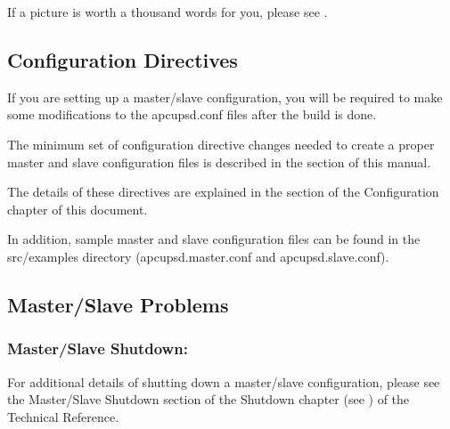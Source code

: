 {{{{{{If a picture is worth a thousand words for you, please see 
. 

\label{Configuration-Directives}

\subsection*{Configuration Directives}

\label{index-Directives-153}
\label{index-Configuration_002c-Directives-154}
If you are setting up a master/slave configuration, you will be required to
make some modifications to the apcupsd.conf files after the build is done.  

The minimum set of configuration directive changes needed to create a proper
master and slave configuration files is described in the 
 section of
this manual.  

The details of these directives are explained in the 
 section of the
Configuration chapter of this document.  

In addition, sample master and slave configuration files can be found in the
\lt{}src\gt{}/examples directory (apcupsd.master.conf and apcupsd.slave.conf).


\label{Master_002fSlave-Problems}

\subsection*{Master/Slave Problems}

\label{index-Master_002fSlave-155}
\label{index-Problems_002c-Master_002fslave-156}

\label{Master_002fSlave-Shutdown}

\subsubsection*{Master/Slave Shutdown:}

For additional details of shutting down a master/slave configuration, please
see the Master/Slave Shutdown section of the Shutdown chapter (see 
) of the Technical
Reference. 

}}}}}}

